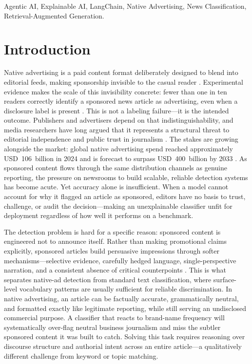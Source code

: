 \documentclass{ieeeaccess}
\begin{document}
\begin{keywords}
Agentic AI, Explainable AI, LangChain, Native Advertising, News Classification, Retrieval-Augmented Generation.
\end{keywords}

\titlepgskip=-15pt

\maketitle

\section{Introduction}
\label{sec:introduction}

Native advertising is a paid content format deliberately designed to blend into editorial feeds, making sponsorship invisible to the casual reader \cite{r1}. Experimental evidence makes the scale of this invisibility concrete: fewer than one in ten readers correctly identify a sponsored news article as advertising, even when a disclosure label is present \cite{r2}. This is not a labeling failure—it is the intended outcome. Publishers and advertisers depend on that indistinguishability, and media researchers have long argued that it represents a structural threat to editorial independence and public trust in journalism \cite{r3}. The stakes are growing alongside the market: global native advertising spend reached approximately USD~106~billion in 2024 and is forecast to surpass USD~400~billion by 2033 \cite{r4}. As sponsored content flows through the same distribution channels as genuine reporting, the pressure on newsrooms to build scalable, reliable detection systems has become acute. Yet accuracy alone is insufficient. When a model cannot account for why it flagged an article as sponsored, editors have no basis to trust, challenge, or audit the decision—making an unexplainable classifier unfit for deployment regardless of how well it performs on a benchmark.

The detection problem is hard for a specific reason: sponsored content is engineered not to announce itself. Rather than making promotional claims explicitly, sponsored articles build persuasive impressions through softer mechanisms—selective evidence, carefully hedged language, single-perspective narration, and a consistent absence of critical counterpoints \cite{r6}. This is what separates native-ad detection from standard text classification, where surface-level vocabulary patterns are usually sufficient for reliable discrimination. In native advertising, an article can be factually accurate, grammatically neutral, and formatted exactly like legitimate reporting, while still serving an undisclosed commercial purpose. A classifier that reacts to brand-name frequency will systematically over-flag neutral business journalism and miss the subtler sponsored content it was built to catch. Solving this task requires reasoning over discourse structure and authorial intent across an entire article—a qualitatively different challenge from keyword or topic matching.
\end{document}
